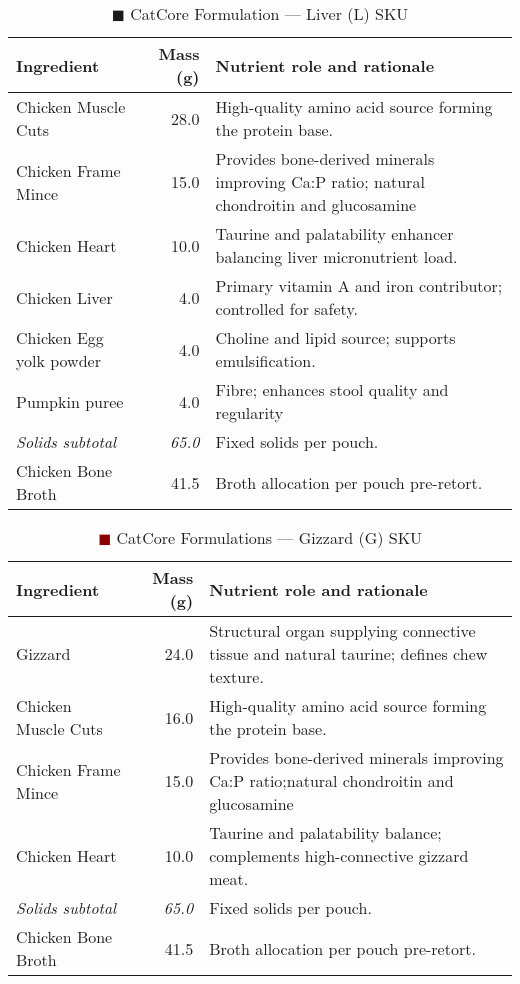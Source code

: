 \begin{table}[htbp]
\centering
\caption{\textcolor{lightred}{$\blacksquare$} CatCore Formulation --- Liver (L) SKU}
\label{tab:liver_sku_3col}
\begin{adjustbox}{max width=\textwidth}
\begin{tabular}{@{}l r p{8.0cm}@{}}
\toprule
\textbf{Ingredient} & \textbf{Mass (g)} & \textbf{Nutrient role and rationale} \\
\midrule
Chicken Muscle Cuts & 28.0 & High-quality amino acid source forming the protein base. \\[3pt]
Chicken Frame Mince & 15.0 & Provides bone-derived minerals improving Ca:P ratio; natural chondroitin and glucosamine \\[3pt]
Chicken Heart & 10.0 & Taurine and palatability enhancer balancing liver micronutrient load. \\[3pt]
Chicken Liver & 4.0 & Primary vitamin A and iron contributor; controlled for safety. \\[3pt]
Chicken Egg yolk powder & 4.0 & Choline and lipid source; supports emulsification. \\[3pt]
Pumpkin puree & 4.0 & Fibre; enhances stool quality and regularity \\[3pt]
\textit{Solids subtotal} & \textit{65.0} & Fixed solids per pouch. \\[3pt]
Chicken Bone Broth & 41.5 & Broth allocation per pouch pre-retort. \\[3pt]
\bottomrule
\end{tabular}
\end{adjustbox}
\end{table}

\begin{table}[htbp]
\centering
\caption{\textcolor{darkred}{$\blacksquare$} CatCore  Formulations --- Gizzard (G) SKU}
\label{tab:gizzard_sku_3col}
\begin{adjustbox}{max width=\textwidth}
\begin{tabular}{@{}l r p{8.0cm}@{}}
\toprule
\textbf{Ingredient} & \textbf{Mass (g)} & \textbf{Nutrient role and rationale} \\
\midrule
Gizzard & 24.0 & Structural organ supplying connective tissue and natural taurine; defines chew texture. \\[3pt]
Chicken Muscle Cuts & 16.0 & High-quality amino acid source forming the protein base. \\[3pt]
Chicken Frame Mince & 15.0 & Provides bone-derived minerals improving Ca:P ratio;natural chondroitin and glucosamine  \\[3pt]
Chicken Heart & 10.0 & Taurine and palatability balance; complements high-connective gizzard meat. \\[3pt]
\textit{Solids subtotal} & \textit{65.0} & Fixed solids per pouch. \\[3pt]
Chicken Bone Broth & 41.5 & Broth allocation per pouch pre-retort. \\[3pt]
\bottomrule
\end{tabular}
\end{adjustbox}
\end{table}


